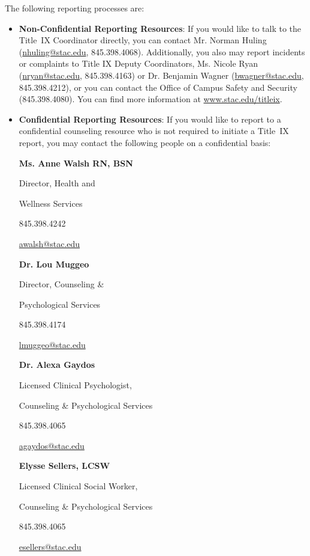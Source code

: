 \documentclass[11pt,letterpaper]{article}
\begin{document}
The following reporting processes are:
	\begin{itemize}
	\item {\bfseries Non-Confidential Reporting Resources}: If you would like to talk to the Title~IX Coordinator directly, you can contact Mr. Norman Huling (\href{mailto:nhuling@stac.edu}{nhuling@stac.edu}, 845.398.4068). Additionally, you also may report incidents or complaints to Title IX Deputy Coordinators, Ms. Nicole Ryan (\href{mailto:nryan@stac.edu}{nryan@stac.edu}, 845.398.4163) or Dr. Benjamin Wagner (\href{mailto:bwagner@stac.edu}{bwagner@stac.edu}, 845.398.4212), or you can contact the Office of Campus Safety and Security (845.398.4080). You can find more information at \url{www.stac.edu/titleix}.
	
	\item {\bfseries Confidential Reporting Resources}: If you would like to report  to a confidential counseling resource who is not required to initiate a Title~IX report, you may contact the following people on a confidential basis: 

	\hfill\begin{minipage}[t]{0.49\textwidth}
	{\bfseries Ms. Anne Walsh RN, BSN} \par
	Director, Health and \par 
	Wellness Services \par
	845.398.4242 \par
	\href{mailto:awalsh@stac.edu}{awalsh@stac.edu}
	\end{minipage}\begin{minipage}[t]{0.49\textwidth}
	{\bfseries Dr. Lou Muggeo} \par
	Director, Counseling \& \par
	Psychological Services \par
	845.398.4174 \par
	\href{mailto:lmuggeo@stac.edu}{lmuggeo@stac.edu}
        \end{minipage} \pspace
        \hfill\begin{minipage}[t]{0.49\textwidth} 
 	{\bfseries Dr. Alexa Gaydos} \par
	Licensed Clinical Psychologist, \par
	Counseling \& Psychological Services \par
	845.398.4065 \par
	\href{mailto:agaydos@stac.edu}{agaydos@stac.edu}
	\end{minipage}\begin{minipage}[t]{0.49\textwidth} 
	{\bfseries Elysse Sellers, LCSW} \par
	Licensed Clinical Social Worker, \par
	Counseling \& Psychological Services \par
	845.398.4065 \par
	\href{mailto:esellers@stac.edu}{esellers@stac.edu}
        \end{minipage} 
        

\end{itemize}
\end{document}
